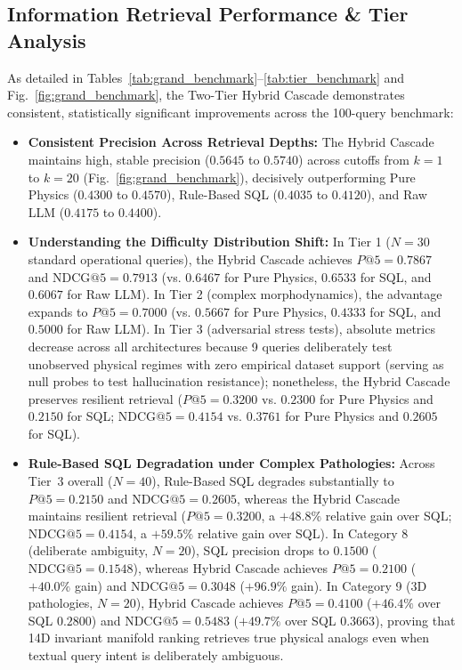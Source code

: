 \documentclass[journal]{IEEEtran}
\begin{document}
\subsection{Information Retrieval Performance \& Tier Analysis}
As detailed in Tables~\ref{tab:grand_benchmark}--\ref{tab:tier_benchmark} and Fig.~\ref{fig:grand_benchmark}, the Two-Tier Hybrid Cascade demonstrates consistent, statistically significant improvements across the 100-query benchmark:
\begin{itemize}
    \item \textbf{Consistent Precision Across Retrieval Depths:} The Hybrid Cascade maintains high, stable precision ($0.5645$ to $0.5740$) across cutoffs from $k = 1$ to $k = 20$ (Fig.~\ref{fig:grand_benchmark}), decisively outperforming Pure Physics ($0.4300$ to $0.4570$), Rule-Based SQL ($0.4035$ to $0.4120$), and Raw LLM ($0.4175$ to $0.4400$).
    \item \textbf{Understanding the Difficulty Distribution Shift:} In Tier 1 ($N=30$ standard operational queries), the Hybrid Cascade achieves $P@5 = 0.7867$ and $\text{NDCG@5} = 0.7913$ (vs. $0.6467$ for Pure Physics, $0.6533$ for SQL, and $0.6067$ for Raw LLM). In Tier 2 (complex morphodynamics), the advantage expands to $P@5 = 0.7000$ (vs. $0.5667$ for Pure Physics, $0.4333$ for SQL, and $0.5000$ for Raw LLM). In Tier 3 (adversarial stress tests), absolute metrics decrease across all architectures because 9 queries deliberately test unobserved physical regimes with zero empirical dataset support (serving as null probes to test hallucination resistance); nonetheless, the Hybrid Cascade preserves resilient retrieval ($P@5 = 0.3200$ vs. $0.2300$ for Pure Physics and $0.2150$ for SQL; $\text{NDCG@5} = 0.4154$ vs. $0.3761$ for Pure Physics and $0.2605$ for SQL).
    \item \textbf{Rule-Based SQL Degradation under Complex Pathologies:} Across Tier~3 overall ($N = 40$), Rule-Based SQL degrades substantially to $P@5 = 0.2150$ and $\text{NDCG@5} = 0.2605$, whereas the Hybrid Cascade maintains resilient retrieval ($P@5 = 0.3200$, a $+48.8\%$ relative gain over SQL; $\text{NDCG@5} = 0.4154$, a $+59.5\%$ relative gain over SQL). In Category 8 (deliberate ambiguity, $N = 20$), SQL precision drops to $0.1500$ ($\text{NDCG@5} = 0.1548$), whereas Hybrid Cascade achieves $P@5 = 0.2100$ ($+40.0\%$ gain) and $\text{NDCG@5} = 0.3048$ ($+96.9\%$ gain). In Category 9 (3D pathologies, $N = 20$), Hybrid Cascade achieves $P@5 = 0.4100$ ($+46.4\%$ over SQL $0.2800$) and $\text{NDCG@5} = 0.5483$ ($+49.7\%$ over SQL $0.3663$), proving that 14D invariant manifold ranking retrieves true physical analogs even when textual query intent is deliberately ambiguous.

\end{itemize}
\end{document}
